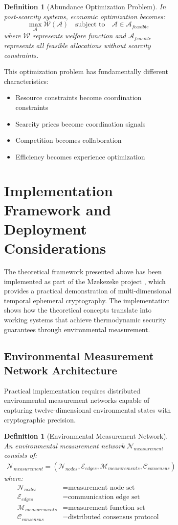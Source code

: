 \documentclass[12pt,a4paper]{article}
\newtheorem{definition}[theorem]{Definition}
\begin{document}
\begin{figure}[H]
\begin{figure}[H]
\begin{definition}[Abundance Optimization Problem]
In post-scarcity systems, economic optimization becomes:
\begin{equation}
\max_{\mathcal{A}} \mathcal{W}(\mathcal{A}) \quad \text{subject to} \quad \mathcal{A} \in \mathcal{A}_{feasible}
\end{equation}
where $\mathcal{W}$ represents welfare function and $\mathcal{A}_{feasible}$ represents all feasible allocations without scarcity constraints.
\end{definition}

This optimization problem has fundamentally different characteristics:
\begin{itemize}
\item Resource constraints become coordination constraints
\item Scarcity prices become coordination signals  
\item Competition becomes collaboration
\item Efficiency becomes experience optimization
\end{itemize}

\section{Implementation Framework and Deployment Considerations}

The theoretical framework presented above has been implemented as part of the Mzekezeke project \cite{mzekezeke2024}, which provides a practical demonstration of multi-dimensional temporal ephemeral cryptography. The implementation shows how the theoretical concepts translate into working systems that achieve thermodynamic security guarantees through environmental measurement.

\subsection{Environmental Measurement Network Architecture}

Practical implementation requires distributed environmental measurement networks capable of capturing twelve-dimensional environmental states with cryptographic precision.

\begin{definition}[Environmental Measurement Network]
An environmental measurement network $\mathcal{N}_{measurement}$ consists of:
\begin{align}
\mathcal{N}_{measurement} = (\mathcal{N}_{nodes}, \mathcal{E}_{edges}, \mathcal{M}_{measurements}, \mathcal{C}_{consensus})
\end{align}
where:
\begin{align}
\mathcal{N}_{nodes} &= \text{measurement node set} \\
\mathcal{E}_{edges} &= \text{communication edge set} \\
\mathcal{M}_{measurements} &= \text{measurement function set} \\
\mathcal{C}_{consensus} &= \text{distributed consensus protocol}
\end{align}
\end{definition}


\end{figure}
\end{figure}
\end{document}
